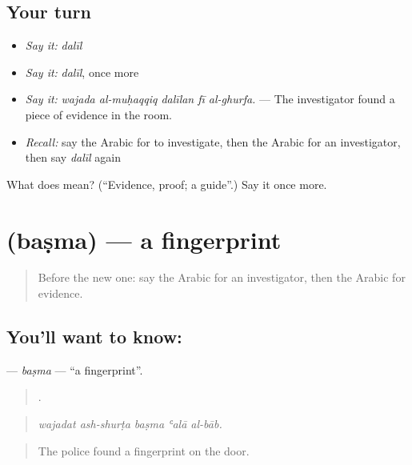 \subsection*{Your turn}
\begin{itemize}
\raggedright
  \item \emph{Say it:} \emph{dalīl}
  \item \emph{Say it:} \emph{dalīl}, once more
  \item \emph{Say it:} \emph{wajada al-muḥaqqiq dalīlan fī al-ghurfa.} — The investigator found a piece of evidence in the room.
  \item \emph{Recall:} say the Arabic for to investigate, then the Arabic for an investigator, then say \emph{dalīl} again
\end{itemize}

\begin{tcolorbox}[breakable,colback=teal!4,colframe=teal!35!black,title={Before you move on}]
What does  mean? (\textquotedblleft{}Evidence, proof; a guide\textquotedblright{}.) Say it once more.
\end{tcolorbox}
\section[\texorpdfstring{\ar{بصمة} (baṣma)}{بصمة (baṣma)}]{ (baṣma) — a fingerprint}

\label{lesson:AR-C308-basma}



\begin{quote}
Before the new one: say the Arabic for an investigator, then the Arabic for evidence.
\end{quote}

\subsection*{You'll want to know: }
\textbf{} — \emph{baṣma} — \textquotedblleft{}a fingerprint\textquotedblright{}.

\begin{quote}
    .
\end{quote}

\begin{quote}
\emph{wajadat ash-shurṭa baṣma ʿalā al-bāb.}
\end{quote}

\begin{quote}
The police found a fingerprint on the door.
\end{quote}

